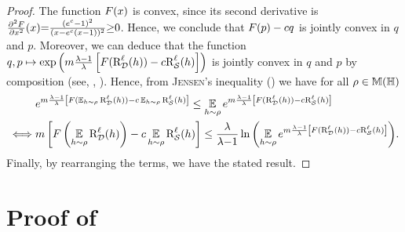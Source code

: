 \begin{noaddcontents}
\begin{proof}
The function $F(x)$ is convex, since its second derivative is $\frac{\partial^2F}{\partial x^2}(x) {=} \frac{(e^c-1)^2}{(x-e^c(x-1))^2}{\ge} 0$.
Hence, we conclude that $F(p)-c q$ is jointly convex in $q$ and $p$.
Moreover, we can deduce that the function $q,p \mapsto \exp\left( m\frac{\lambda-1}{\lambda}\left[F(\text{R}^{\ell}_{\mathcal{D}}(h))-c\text{R}^{\ell}_{\mathcal{S}}(h)\right]\right)$ is jointly convex in $q$ and $p$ by composition (see, \eg, \citet{BoydVandenberghe2014}).
Hence, from \textsc{Jensen}'s inequality () we have for all $\rho\in\mathbb{M}(\mathbb{H})$
\begin{align*}
&e^{m\frac{\lambda-1}{\lambda}\left[F(\operatorname*{\mathbb{E}}_{h\sim\rho}\text{R}^{\ell}_{\mathcal{D}}(h))-c\operatorname*{\mathbb{E}}_{h\sim\rho}\text{R}^{\ell}_{\mathcal{S}}(h)\right]} \le \operatorname*{\mathbb{E}}_{h\sim\rho}e^{m\frac{\lambda-1}{\lambda}\left[F(\text{R}^{\ell}_{\mathcal{D}}(h))-c\text{R}^{\ell}_{\mathcal{S}}(h)\right]}\\
\iff &m\left[F\left(\operatorname*{\mathbb{E}}_{h\sim\rho}\text{R}^{\ell}_{\mathcal{D}}(h)\right)-c\operatorname*{\mathbb{E}}_{h\sim\rho}\text{R}^{\ell}_{\mathcal{S}}(h)\right] \le \frac{\lambda}{\lambda{-}1}\ln\left(\operatorname*{\mathbb{E}}_{h\sim\rho}e^{m\frac{\lambda-1}{\lambda}\left[F(\text{R}^{\ell}_{\mathcal{D}}(h))-c\text{R}^{\ell}_{\mathcal{S}}(h)\right]}\right)\!.
\end{align*}
Finally, by rearranging the terms, we have the stated result.
\end{proof}

\section{Proof of }
\label{ap:pac-bayes:sec:proof-general-disintegrated-rivasplata}


\end{noaddcontents}
